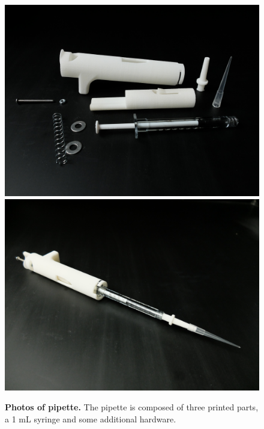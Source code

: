 \begin{figure}
\includegraphics[scale=0.04]{figure-images/pipette-disassembled.JPG} %
\includegraphics[scale=0.04]{figure-images/pipette-assembled.JPG} %
\caption{
{\bf Photos of pipette.}  The pipette is composed of three printed parts, a 1 mL syringe and some additional hardware.  
}
\label{photo-parts-figure}
\end{figure}



